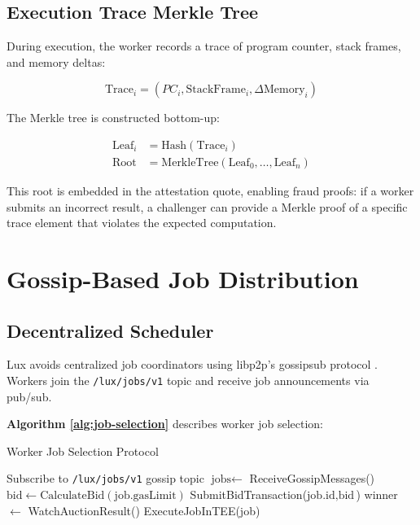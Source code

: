 \documentclass[11pt,letterpaper]{article}
\begin{document}
\subsection{Execution Trace Merkle Tree}

During execution, the worker records a trace of program counter, stack frames, and memory deltas:

\begin{equation}
\text{Trace}_i = (PC_i, \text{StackFrame}_i, \Delta\text{Memory}_i)
\end{equation}

The Merkle tree is constructed bottom-up:

\begin{align}
\text{Leaf}_i &= \text{Hash}(\text{Trace}_i) \\
\text{Root} &= \text{MerkleTree}(\text{Leaf}_0, \ldots, \text{Leaf}_n)
\end{align}

This root is embedded in the attestation quote, enabling fraud proofs: if a worker submits an incorrect result, a challenger can provide a Merkle proof of a specific trace element that violates the expected computation.

\section{Gossip-Based Job Distribution}
\label{sec:scheduler}

\subsection{Decentralized Scheduler}

Lux avoids centralized job coordinators using libp2p's gossipsub protocol \cite{libp2p-gossipsub}. Workers join the \texttt{/lux/jobs/v1} topic and receive job announcements via pub/sub.

\textbf{Algorithm \ref{alg:job-selection}} describes worker job selection:

\begin{algorithm}
\caption{Worker Job Selection Protocol}
\label{alg:job-selection}
\begin{algorithmic}[1]
\STATE Subscribe to \texttt{/lux/jobs/v1} gossip topic
  \STATE $\text{jobs} \leftarrow$ ReceiveGossipMessages()
        \STATE $\text{bid} \leftarrow \text{CalculateBid}(\text{job.gasLimit})$
        \STATE SubmitBidTransaction($\text{job.id}, \text{bid}$)
      \ENDIF
    \ENDIF
  \ENDFOR
  \STATE winner $\leftarrow$ WatchAuctionResult()
    \STATE ExecuteJobInTEE(job)
  \ENDIF
\ENDWHILE
\end{algorithmic}
\end{algorithm}
\end{document}
